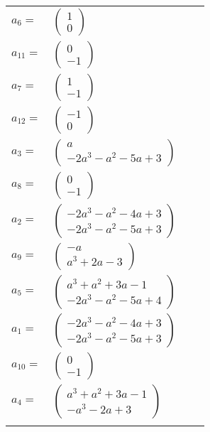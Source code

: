 \documentclass[1p]{elsarticle_modified}
\theoremstyle{definition}
\begin{document}
\begin{tabular}{m{7pt} m{180pt} m{7pt} m{180pt} }
\flushright $a_{6}=$&$\begin{pmatrix}1\\0\end{pmatrix}$ \\
\flushright $a_{11}=$&$\begin{pmatrix}0\\-1\end{pmatrix}$ \\
\flushright $a_{7}=$&$\begin{pmatrix}1\\-1\end{pmatrix}$ \\
\flushright $a_{12}=$&$\begin{pmatrix}-1\\0\end{pmatrix}$ \\
\flushright $a_{3}=$&$\begin{pmatrix}a\\-2 a^3- a^2-5 a+3\end{pmatrix}$ \\
\flushright $a_{8}=$&$\begin{pmatrix}0\\-1\end{pmatrix}$ \\
\flushright $a_{2}=$&$\begin{pmatrix}-2 a^3- a^2-4 a+3\\-2 a^3- a^2-5 a+3\end{pmatrix}$ \\
\flushright $a_{9}=$&$\begin{pmatrix}- a\\a^3+2 a-3\end{pmatrix}$ \\
\flushright $a_{5}=$&$\begin{pmatrix}a^3+a^2+3 a-1\\-2 a^3- a^2-5 a+4\end{pmatrix}$ \\
\flushright $a_{1}=$&$\begin{pmatrix}-2 a^3- a^2-4 a+3\\-2 a^3- a^2-5 a+3\end{pmatrix}$ \\
\flushright $a_{10}=$&$\begin{pmatrix}0\\-1\end{pmatrix}$ \\
\flushright $a_{4}=$&$\begin{pmatrix}a^3+a^2+3 a-1\\- a^3-2 a+3\end{pmatrix}$\\&\end{tabular}
\end{document}
